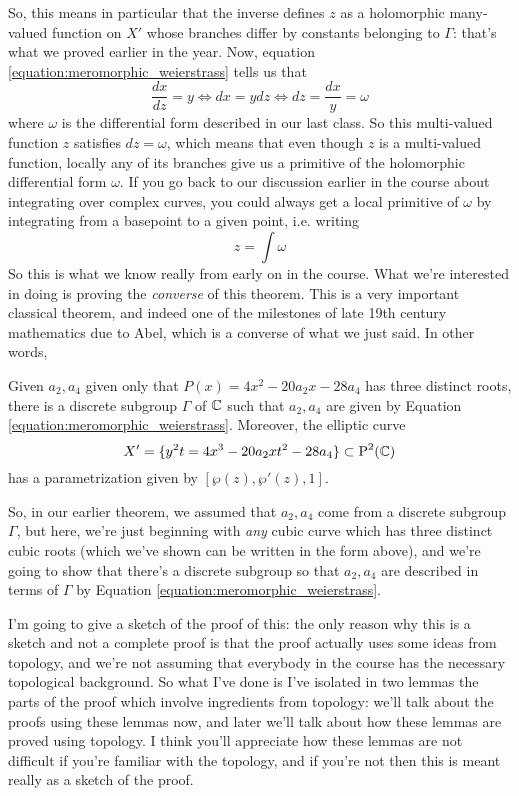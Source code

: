 \documentclass{article}
\begin{document}
So, this means in particular that the inverse defines \(z\) as a holomorphic many-valued function on \(X'\) whose branches differ by constants belonging to \(\Gamma\): that's what we proved earlier in the year. Now, equation \ref{equation:meromorphic_weierstrass} tells us that
\begin{equation}
\frac{dx}{dz} = y \iff dx = ydz \iff dz = \frac{dx}{y} = \omega
\end{equation}
where \(\omega\) is the differential form described in our last class. So this multi-valued function \(z\) satisfies \(dz = \omega\), which means that even though \(z\) is a multi-valued function, locally any of its branches give us a primitive of the holomorphic differential form \(\omega\). If you go back to our discussion earlier in the course about integrating over complex curves, you could always get a local primitive of \(\omega\) by integrating from a basepoint to a given point, i.e. writing
\begin{equation}
  z = \int\omega
\end{equation}
So this is what we know really from early on in the course. What we're interested in doing is proving the \textit{converse} of this theorem. This is a very important classical theorem, and indeed one of the milestones of late 19th century mathematics due to Abel, which is a converse of what we just said. In other words,
\begin{theorem}
Given \(a_2, a_4\) given only that \(P(x) = 4x^2 - 20a_2x - 28a_4\) has three distinct roots, there is a discrete subgroup \(\Gamma\) of \(\mathbb{C}\) such that \(a_2, a_4\) are given by Equation \ref{equation:meromorphic_weierstrass}. Moreover, the elliptic curve
\begin{equation}
  X' = \{y^2t = 4x^3 - 20a_2xt^2 - 28a_4\} \subset \operatorname{P}^{2}({\mathbb{C}})
  \label{equation:abel_completion}
\end{equation}
has a parametrization given by \([\wp(z), \wp'(z), 1]\).
\end{theorem}
So, in our earlier theorem, we assumed that \(a_2, a_4\) come from a discrete subgroup \(\Gamma\), but here, we're just beginning with \textit{any} cubic curve which has three distinct cubic roots (which we've shown can be written in the form above), and we're going to show that there's a discrete subgroup so that \(a_2, a_4\) are described in terms of \(\Gamma\) by Equation \ref{equation:meromorphic_weierstrass}.

I'm going to give a sketch of the proof of this: the only reason why this is a sketch and not a complete proof is that the proof actually uses some ideas from topology, and we're not assuming that everybody in the course has the necessary topological background. So what I've done is I've isolated in two lemmas the parts of the proof which involve ingredients from topology: we'll talk about the proofs using these lemmas now, and later we'll talk about how these lemmas are proved using topology. I think you'll appreciate how these lemmas are not difficult if you're familiar with the topology, and if you're not then this is meant really as a sketch of the proof.
\end{document}
